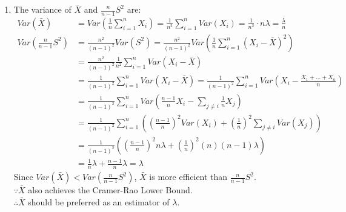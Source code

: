 \documentclass{article}
\begin{document}
\begin{enumerate}
\begin{enumerate}[label=(\roman*)]
    \item The variance of $\bar{X}$ and $\frac{n}{n-1} S^2$ are:
    \begin{align*}
    Var(\bar{X}) &= Var(\frac{1}{n} \sum_{i=1}^n X_i) = \frac{1}{n^2} \sum_{i=1}^n Var(X_i) = \frac{1}{n^2} \cdot n \lambda = \frac{\lambda}{n} \\
    Var\left( \frac{n}{n-1} S^2 \right) &= \frac{n^2}{(n-1)^2} Var(S^2) = \frac{n^2}{(n-1)^2} Var(\frac{1}{n} \sum_{i=1}^n (X_i - \bar{X})^2) \\
    &= \frac{n^2}{(n-1)^2} \frac{1}{n^2} \sum_{i=1}^n Var(X_i - \bar{X}) \\
    &= \frac{1}{(n-1)^2} \sum_{i=1}^n Var(X_i - \bar{X}) = \frac{1}{(n-1)^2} \sum_{i=1}^n Var(X_i - \frac{X_1 + \dots + X_n}{n}) \\
    &= \frac{1}{(n-1)^2} \sum_{i=1}^n Var(\frac{n-1}{n} X_i - \sum_{j \neq i} \frac{1}{n} X_j) \\
    &= \frac{1}{(n-1)^2} \sum_{i=1}^n \left( \left( \frac{n-1}{n} \right)^2 Var(X_i) + \left( \frac{1}{n} \right)^2 \sum_{j \neq i} Var(X_j) \right) \\
    &= \frac{1}{(n-1)^2} \left( \left( \frac{n-1}{n} \right)^2 n \lambda + \left( \frac{1}{n} \right)^2 (n)(n-1) \lambda \right) \\
    &= \frac{1}{n} \lambda + \frac{n-1}{n} \lambda = \lambda
    \end{align*}
    Since $Var(\bar{X}) < Var\left( \frac{n}{n-1} S^2 \right)$, $\bar{X}$ is more efficient than $\frac{n}{n-1} S^2$. \\
    $\because \bar{X}$ also achieves the Cramer-Rao Lower Bound. \\
    $\therefore \bar{X}$ should be preferred as an estimator of $\lambda$.
    \end{enumerate}


\end{enumerate}
\end{document}
